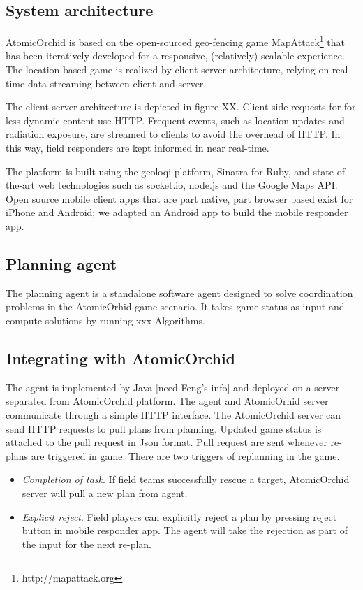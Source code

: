 \subsection{System architecture}
AtomicOrchid is based on the open-sourced geo-fencing game MapAttack\footnote{http://mapattack.org} that has been iteratively developed for a responsive, (relatively) scalable experience.  The location-based game is realized by client-server architecture, relying on real-time data streaming between client and server.

The client-server architecture is depicted in figure XX. Client-side requests for for less dynamic content use HTTP. Frequent events, such as location updates and radiation exposure, are streamed to clients to avoid the overhead of HTTP. In this way, field responders are kept informed in near real-time.

The platform is built using the geoloqi platform, Sinatra for Ruby, and state-of-the-art web technologies such as socket.io, node.js and the Google Maps API. Open source mobile client apps that are part native, part browser based exist for iPhone and Android; we adapted an Android app to build the mobile responder app.

\subsection{Planning agent}
The planning agent is a standalone software agent designed to solve coordination problems in the AtomicOrhid game scenario. It takes game status as input and compute solutions by running xxx Algorithms. 

\subsection{Integrating with AtomicOrchid}
The agent is implemented by Java [need Feng's info] and deployed on a server separated from AtomicOrchid platform. The agent and AtomicOrhid server communicate through a simple HTTP interface. The AtomicOrchid server can send HTTP requests to pull plans from planning. Updated game status is attached to the pull request in Json format. Pull request are sent whenever re-plans are triggered in game. There are two triggers of replanning in the game.


\begin{itemize}
\item \textit{Completion of task}. If field teams successfully rescue a target, AtomicOrchid server will pull a new plan from agent.
\item \textit{Explicit reject}. Field players can explicitly reject a plan by pressing reject button in mobile responder app. The agent will take the rejection as part of the input for the next re-plan.
\end{itemize} 

